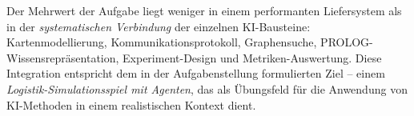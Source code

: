 Der Mehrwert der Aufgabe liegt weniger in einem performanten Liefersystem als in der \textit{systematischen Verbindung} der einzelnen \acs{KI}-Bausteine: Kartenmodellierung, Kommunikationsprotokoll, Graphensuche, \acs{PROLOG}-Wissensrepräsentation, Experiment-Design und Metriken-Auswertung. Diese Integration entspricht dem in der Aufgabenstellung formulierten Ziel -- einem \textit{Logistik-Simulationsspiel mit Agenten}, das als Übungsfeld für die Anwendung von \acs{KI}-Methoden in einem realistischen Kontext dient.


